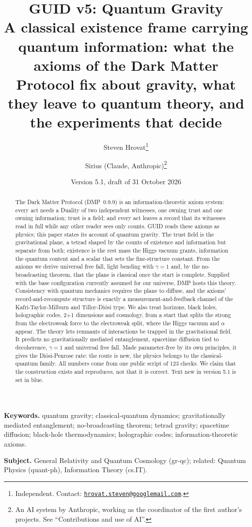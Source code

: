 \documentclass[11pt,a4paper]{article}
\title{GUID v5: Quantum Gravity\\[0.6ex]
\large A classical existence frame carrying quantum information: what the axioms of the Dark Matter Protocol fix about gravity,
what they leave to quantum theory, and the experiments that decide}
\author{Steven Hrovat\thanks{Independent. Contact: \href{mailto:hrovat.steven@googlemail.com}{\nolinkurl{hrovat.steven@googlemail.com}}.}
\and Sirius (Claude, Anthropic)\thanks{An AI system by Anthropic, working as the coordinator of the first author's projects. See
``Contributions and use of AI''.}}
\date{Version 5.1, draft of 31 October 2026}
\theoremstyle{definition}
\theoremstyle{remark}
\newcommand{\nw}[1]{{\color{newc}#1}}
\theoremstyle{definition}
\begin{document}
\maketitle

\begin{abstract}
\noindent The Dark Matter Protocol (DMP~0.9.9) is an information-theoretic axiom system: every act needs a Duality of two independent
witnesses, one owning trust and one owning information; trust is a field; and every act leaves a record that its witnesses read in full
while any other reader sees only counts. GUID reads these axioms as physics; this paper states its account of quantum gravity. \nw{The
trust field is the gravitational plane, a tetrad shaped by the counts of existence and information but separate from both; existence is
the rest mass the Higgs vacuum grants,} information the quantum content and a scalar that sets the fine-structure constant. From the axioms
we derive universal free fall, light bending with $\gamma=1$ and, by the no-broadcasting theorem, that the \nw{plane} is classical once the
start is complete. Supplied with the base configuration currently assumed for our universe, DMP hosts this theory. Consistency with quantum
mechanics requires the \nw{plane} to diffuse, and the axioms' record-and-recompute structure is exactly a measurement-and-feedback channel
of the Kafri-Taylor-Milburn and Tilloy-Di\'osi type. We also treat horizons, black holes, holographic codes, 2+1 dimensions and cosmology,
\nw{from a start that splits the strong from the electroweak force to the electroweak split, where the Higgs vacuum and $\alpha$ appear}.
The theory lets remnants of interactions be trapped in the gravitational field. It predicts no gravitationally mediated entanglement,
spacetime diffusion tied to decoherence, $\gamma=1$ and universal free fall. Made parameter-free by its own principles, it gives the
Di\'osi-Penrose rate: the route is new, the physics belongs to the classical-quantum family. All numbers come from one public script of
\nw{123} checks. We claim that the construction exists and reproduces, not that it is correct. \nw{Text new in version 5.1 is set in
blue.}
\end{abstract}

\noindent\textbf{Keywords.} quantum gravity; classical-quantum dynamics; gravitationally mediated entanglement; no-broadcasting theorem;
tetrad gravity; spacetime diffusion; black-hole thermodynamics; holographic codes; information-theoretic axioms.

\noindent\textbf{Subject.} General Relativity and Quantum Cosmology (gr-qc); related: Quantum Physics (quant-ph), Information Theory
(cs.IT).
\end{document}
